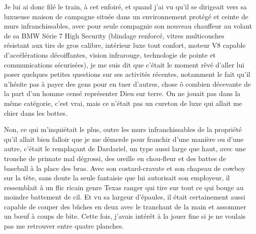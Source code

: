 \illusloflabel{}%
% 
Je lui ai donc filé le train, à cet enfoiré, et quand j’ai vu qu’il se dirigeait vers sa luxueuse maison de campagne située dans un environnement protégé et ceinte de murs infranchissables, avec pour seule compagnie son nouveau chauffeur au volant de sa BMW Série 7 High Security (blindage renforcé, vitres multicouches résistant aux tirs de gros calibre, intérieur luxe tout confort, moteur V8 capable d’accélérations décoiffantes, vision infrarouge, technologie de pointe et communications sécurisées), je me suis dit que c’était le moment rêvé d’aller lui poser quelques petites questions sur ses activités récentes, notamment le fait qu’il n’hésite pas à payer des gens pour en tuer d’autres, chose ô combien décevante de la part d’un homme censé représenter Dieu sur terre. On ne jouait pas dans la même catégorie, c’est vrai, mais ce n’était pas un cureton de luxe qui allait me chier dans les bottes.

Non, ce qui m’inquiétait le plus, outre les murs infranchissables de la propriété qu’il allait bien falloir que je me démerde pour franchir d’une manière ou d’une autre, c’était le remplaçant de Dardariel, un type aussi large que haut, avec une tronche de primate mal dégrossi, des oreille en chou-fleur et des battes de baseball à la place des bras. Avec son costard-cravate et son chapeau de cowboy sur la tête, sans doute la seule fantaisie que lui autorisait son employeur, il ressemblait à un flic ricain genre Texas ranger qui tire sur tout ce qui bouge au moindre battement de cil. Et vu sa largeur d’épaules, il était certainement aussi capable de couper des bûches en deux avec le tranchant de la main et assommer un bœuf à coups de bite. Cette fois, j’avais intérêt à la jouer fine si je ne voulais pas me retrouver entre quatre planches.

